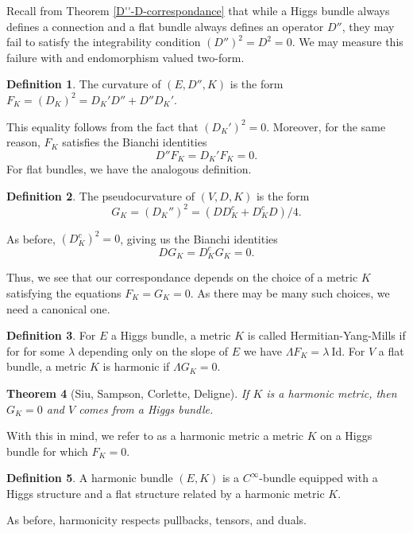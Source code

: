 \documentclass[letterpaper, 12pt]{article}
\newtheorem{theorem}{Theorem}
\theoremstyle{definition}
\newtheorem{definition}[theorem]{Definition}
\newcommand{\smooth}{C^\infty}
\begin{document}
Recall from Theorem \ref{D''-D-correspondance} that while a Higgs bundle always defines a connection and a flat bundle always defines an operator $D''$, they may fail to satisfy the integrability condition $(D'')^2 = D^2 = 0$. We may measure this failure with and endomorphism valued two-form.
\begin{definition}
    The curvature of $(E, D'', K)$ is the form $F_K = (D_K)^2 = D_K' D'' + D'' D_K'$.
\end{definition}
This equality follows from the fact that $(D_K')^2 = 0$. Moreover, for the same reason, $F_K$ satisfies the Bianchi identities
\begin{equation} \label{eq-bianchi-curvature}
    D'' F_K = D_K' F_K = 0.
\end{equation}
For flat bundles, we have the analogous definition.
\begin{definition}
    The pseudocurvature of $(V, D, K)$ is the form
    \[G_K = (D_K'')^2 = (DD_K^c + D_K^c D) / 4.\]
\end{definition}
As before, $(D_K^c)^2 = 0$, giving us the Bianchi identities
\begin{equation} \label{eq-bianchi-pseudocurvature}
    DG_K = D_K^c G_K = 0.
\end{equation}

Thus, we see that our correspondance depends on the choice of a metric $K$ satisfying the equations $F_K = G_K = 0$. As there may be many such choices, we need a canonical one.

\begin{definition}
    For $E$ a Higgs bundle, a metric $K$ is called Hermitian-Yang-Mills if for for some $\lambda$ depending only on the slope of $E$ we have $\Lambda F_K = \lambda\ \text{Id}$. For $V$ a flat bundle, a metric $K$ is harmonic if $\Lambda G_K = 0$.
\end{definition}

\begin{theorem}[Siu, Sampson, Corlette, Deligne]
    If $K$ is a harmonic metric, then $G_K = 0$ and $V$ comes from a Higgs bundle.
\end{theorem}

With this in mind, we refer to as a harmonic metric a metric $K$ on a Higgs bundle for which $F_K = 0$.
\begin{definition}
    A harmonic bundle $(E, K)$ is a $\smooth$-bundle equipped with a Higgs structure and a flat structure related by a harmonic metric $K$.
\end{definition}
As before, harmonicity respects pullbacks, tensors, and duals.
\end{document}
